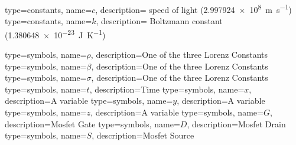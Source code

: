 {
    type=constants,
    name={\ensuremath{c}},
    description={\mbox{} speed of light (\SI{2.997924e8}{\meter\per\second})}
}
{
    type=constants,
    name={\ensuremath{k}},
    description={\mbox{} Boltzmann constant (\SI{1.380648e-23}{\joule\per\kelvin})}
}

{
    type=symbols,
    name={\ensuremath{\rho}},
    description={One of the three Lorenz Constants}
}
{
    type=symbols,
    name={\ensuremath{\beta}},
    description={One of the three Lorenz Constants}
}
{
    type=symbols,
    name={\ensuremath{\sigma}},
    description={One of the three Lorenz Constants}
}
{
    type=symbols,
    name={\ensuremath{t}},
    description={Time}
}
{
    type=symbols,
    name={\ensuremath{x}},
    description={A variable}
}
{
    type=symbols,
    name={\ensuremath{y}},
    description={A variable}
}
{
    type=symbols,
    name={\ensuremath{z}},
    description={A variable}
}
{
    type=symbols,
    name={\ensuremath{G}},
    description={Mosfet Gate}
}
{
    type=symbols,
    name={\ensuremath{D}},
    description={Mosfet Drain}
}
{
    type=symbols,
    name={\ensuremath{S}},
    description={Mosfet Source}
}
